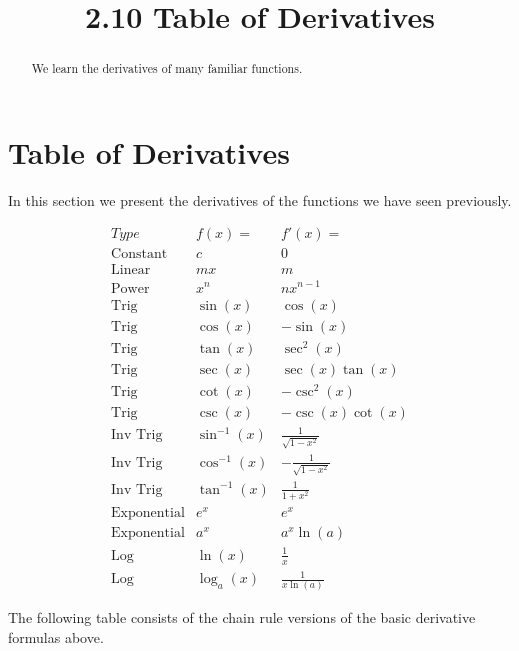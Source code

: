 \documentclass[handout]{ximera}
\title{2.10 Table of Derivatives}
\begin{document}
\begin{abstract}
We learn the derivatives of many familiar functions.
\end{abstract}

\maketitle


\section{Table of Derivatives}

In this section we present the derivatives of the functions we have seen previously.  

\begin{center}
\[
\begin{array}{c|c|c}
		Type & f(x)= & f'(x)=  \\
		\hline
		\text{Constant} & c & 0 \\
		\text{Linear} & mx & m  \\
		\text{Power} & x^n & nx^{n-1}  \\
		\hline
		\text{Trig} & \sin(x) & \cos(x) \\
		\text{Trig} & \cos(x) & -\sin(x) \\
		\hline
		\text{Trig} & \tan(x) & \sec^2(x) \\
		\text{Trig} & \sec(x) & \sec(x)\tan(x) \\
		\hline
		\text{Trig} & \cot(x) & -\csc^2(x)\ \\
		\text{Trig} & \csc(x) & -\csc(x)\cot(x) \\
		\hline
		\text{Inv Trig} & \sin^{-1}(x) & \displaystyle{\frac{1}{\sqrt{1-x^2}}} \\
		\text{Inv Trig} & \cos^{-1}(x) & \displaystyle{-\frac{1}{\sqrt{1-x^2}}} \\
		\text{Inv Trig} & \tan^{-1}(x) & \displaystyle{\frac{1}{1+x^2}} \\
		\hline
		\text{Exponential} & e^x & e^x \\
		\text{Exponential} & a^x & a^x\ln(a) \\
		\hline
		\text{Log} & \ln(x) & \displaystyle{\frac{1}{x}} \\
		\text{Log} & \log_a(x) & \displaystyle{\frac{1}{x\ln(a)}}
	\end{array}
    \]
\end{center}



The following table consists of the chain rule versions of the basic derivative formulas above.
\end{document}
